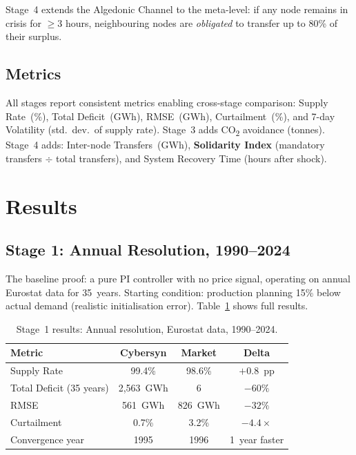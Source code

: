 \documentclass[12pt]{article}
\begin{document}
Stage~4 extends the Algedonic Channel to the meta-level: if any node remains in
crisis for $\geq 3$ hours, neighbouring nodes are \emph{obligated} to transfer up to
80\% of their surplus.

\subsection{Metrics}

All stages report consistent metrics enabling cross-stage comparison: Supply Rate~(\%),
Total Deficit~(GWh), RMSE~(GWh), Curtailment~(\%), and 7-day Volatility
(std.\ dev.\ of supply rate).
Stage~3 adds CO\textsubscript{2} avoidance (tonnes).
Stage~4 adds: Inter-node Transfers~(GWh), \textbf{Solidarity Index} (mandatory
transfers $\div$ total transfers), and System Recovery Time (hours after shock).

\section{Results}

\subsection{Stage 1: Annual Resolution, 1990--2024}

The baseline proof: a pure PI controller with no price signal, operating on annual
Eurostat data for 35~years.
Starting condition: production planning 15\% below actual demand (realistic
initialisation error).
Table~\ref{tab:stage1} shows full results.

\begin{table}[H]
  \centering
  \caption{Stage~1 results: Annual resolution, Eurostat data, 1990--2024.}
  \label{tab:stage1}
  \begin{tabular}{lccc}
    \toprule
    \textbf{Metric} & \textbf{Cybersyn} & \textbf{Market} & \textbf{Delta} \\
    \midrule
    Supply Rate               & 99.4\%     & 98.6\%     & $+0.8$~pp \\
    Total Deficit (35 years)  & 2{,}563~GWh & 6{,|411~GWh & $-60\%$ \\
    RMSE                      & 561~GWh    & 826~GWh    & $-32\%$ \\
    Curtailment               & 0.7\%      & 3.2\%      & $-4.4\times$ \\
    Convergence year          & 1995       & 1996       & 1~year faster \\
    \bottomrule
  \end{tabular}
\end{table}
\end{document}
